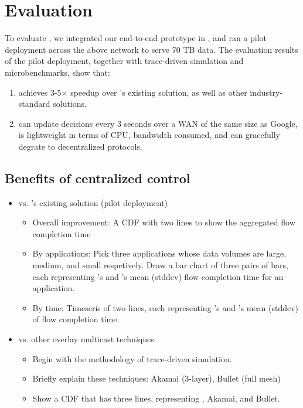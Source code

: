 \section{Evaluation}
\label{sec:evaluation}

To evaluate \name, we integrated our end-to-end prototype in \company, and ran a pilot deployment across the above network to serve 70 TB data.
The evaluation results of the pilot deployment, together with trace-driven simulation and microbenchmarks, show that:
\begin{enumerate}
\item \name achieves 3-5$\times$ speedup over \company's existing solution, as well as other industry-standard solutions.
\item \name can update decisions every 3 seconds over a WAN of the same size as Google, is lightweight in terms of CPU, bandwidth consumed, and can gracefully degrate to decentralized protocols.
\end{enumerate}

\subsection{Benefits of centralized control}
\label{subsec:evaluation:centralized}

\begin{itemize}
\item \name vs. \company's existing solution (pilot deployment)
\begin{itemize}
\item Overall improvement: A CDF with two lines to show the aggregated flow completion time
\item By applications: Pick three applications whose data volumes are large, medium, and small respetively. Draw a bar chart of three pairs of bars, each representing \name's and \company's mean (stddev) flow completion time for an application.
\item By time: Timeseris of two lines, each representing \name's and \company's mean (stddev) of flow completion time.
\end{itemize}

\item \name vs. other overlay multicast techniques
\begin{itemize}
\item Begin with the methodology of trace-driven simulation.
\item Briefly explain these techniques: Akamai (3-layer), Bullet (full mesh)
\item Show a CDF that has three lines, representing \name, Akamai, and Bullet.
\end{itemize}

\end{itemize}

